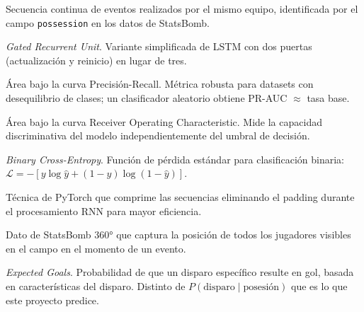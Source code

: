 \documentclass[12pt,a4paper]{article}
\newcommand{\code}[1]{\texttt{\small #1}}
\begin{document}
\begin{description}[leftmargin=2em, style=nextline]
    \item[Posesión] Secuencia continua de eventos realizados por el mismo equipo,
          identificada por el campo \code{possession} en los datos de StatsBomb.
    \item[GRU] \textit{Gated Recurrent Unit}. Variante simplificada de LSTM con dos
          puertas (actualización y reinicio) en lugar de tres.
    \item[PR-AUC] Área bajo la curva Precisión-Recall. Métrica robusta para datasets
          con desequilibrio de clases; un clasificador aleatorio obtiene PR-AUC $\approx$ tasa base.
    \item[ROC-AUC] Área bajo la curva Receiver Operating Characteristic. Mide la
          capacidad discriminativa del modelo independientemente del umbral de decisión.
    \item[BCE] \textit{Binary Cross-Entropy}. Función de pérdida estándar para
          clasificación binaria: $\mathcal{L} = -[y\log\hat{y} + (1-y)\log(1-\hat{y})]$.
    \item[Pack padded sequence] Técnica de PyTorch que comprime las secuencias
          eliminando el padding durante el procesamiento RNN para mayor eficiencia.
    \item[Freeze frame] Dato de StatsBomb 360° que captura la posición de todos
          los jugadores visibles en el campo en el momento de un evento.
    \item[xG] \textit{Expected Goals}. Probabilidad de que un disparo específico
          resulte en gol, basada en características del disparo. Distinto de
          $P(\text{disparo}\mid\text{posesión})$ que es lo que este proyecto predice.
\end{description}
\end{document}
